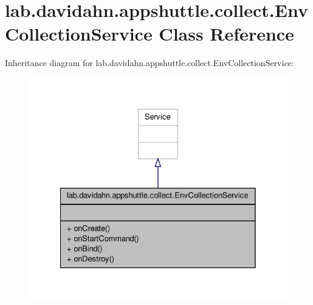 \hypertarget{classlab_1_1davidahn_1_1appshuttle_1_1collect_1_1_env_collection_service}{\section{lab.\-davidahn.\-appshuttle.\-collect.\-Env\-Collection\-Service \-Class \-Reference}
\label{classlab_1_1davidahn_1_1appshuttle_1_1collect_1_1_env_collection_service}
}


\-Inheritance diagram for lab.\-davidahn.\-appshuttle.\-collect.\-Env\-Collection\-Service\-:
\nopagebreak
\begin{figure}[H]
\begin{center}
\leavevmode
\includegraphics[width=328pt]{classlab_1_1davidahn_1_1appshuttle_1_1collect_1_1_env_collection_service__inherit__graph}
\end{center}
\end{figure}


